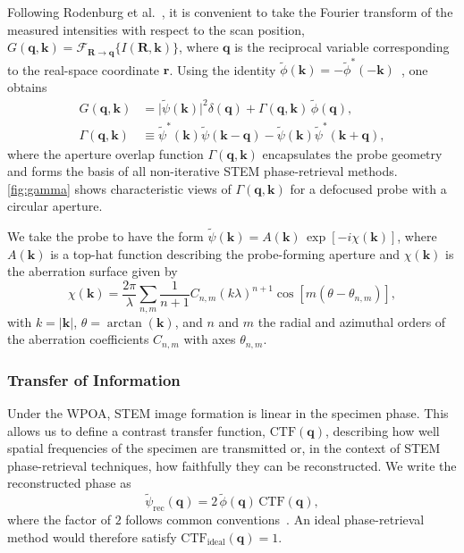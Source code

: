 \documentclass[pdflatex,sn-aps,iicol]{sn-jnl}%
\begin{document}
Following Rodenburg et al.~\cite{Rodenburg_1993}, it is convenient to take the Fourier transform of the measured intensities with respect to the scan position, $G(\boldsymbol{q},\boldsymbol{k}) = \mathcal{F}_{\boldsymbol{R}\rightarrow\boldsymbol{q}}\{I(\boldsymbol{R},\boldsymbol{k})\}$, where $\boldsymbol{q}$ is the reciprocal variable corresponding to the real-space coordinate $\boldsymbol{r}$.
Using the identity $\tilde{\phi}(\boldsymbol{k}) = -\tilde{\phi}^{*}(-\boldsymbol{k})$~\cite{Rodenburg_1993}, one obtains~\cite{Yang_2016}
\begin{align}
  G(\boldsymbol{q},\boldsymbol{k}) &= \lvert \tilde{\psi}(\boldsymbol{k}) \rvert^2 \delta(\boldsymbol{q}) + \Gamma(\boldsymbol{q},\boldsymbol{k})\,\tilde{\phi}(\boldsymbol{q}), \\
  \Gamma(\boldsymbol{q},\boldsymbol{k}) &\equiv \tilde{\psi}^{*}(\boldsymbol{k})\tilde{\psi}(\boldsymbol{k}-\boldsymbol{q}) - \tilde{\psi}(\boldsymbol{k})\tilde{\psi}^{*}(\boldsymbol{k}+\boldsymbol{q}),
  \label{eq:wpoa-forward}
\end{align}
where the aperture overlap function $\Gamma(\boldsymbol{q},\boldsymbol{k})$ encapsulates the probe geometry and forms the basis of all non-iterative STEM phase-retrieval methods.
\cref{fig:gamma} shows characteristic views of $\Gamma(\boldsymbol{q},\boldsymbol{k})$ for a defocused probe with a circular aperture.

We take the probe to have the form $\tilde{\psi}(\boldsymbol{k}) = A(\boldsymbol{k})\,\exp[-i\chi(\boldsymbol{k})]$, where $A(\boldsymbol{k})$ is a top-hat function describing the probe-forming aperture and $\chi(\boldsymbol{k})$ is the aberration surface given by
\begin{equation}
  \chi(\boldsymbol{k}) = \frac{2\pi}{\lambda} \sum_{n,m} \frac{1}{n+1} C_{n,m} (k\lambda)^{n+1} \cos\!\left[m(\theta-\theta_{n,m})\right],
  \label{eq:chi}
\end{equation}
with $k=\lvert\boldsymbol{k}\rvert$, $\theta=\arctan(\boldsymbol{k})$, and $n$ and $m$ the radial and azimuthal orders of the aberration coefficients $C_{n,m}$ with axes $\theta_{n,m}$.

\subsubsection{Transfer of Information}

Under the WPOA, STEM image formation is linear in the specimen phase.
This allows us to define a contrast transfer function, $\mathrm{CTF}(\boldsymbol{q})$, describing how well spatial frequencies of the specimen are transmitted or, in the context of STEM phase-retrieval techniques, how faithfully they can be reconstructed.
We write the reconstructed phase as
\begin{equation}
  \tilde{\psi}_{\text{rec}}(\boldsymbol{q}) = 2\,\tilde{\phi}(\boldsymbol{q})\,\mathrm{CTF}(\boldsymbol{q}),
  \label{eq:recon-ctf}
\end{equation}
where the factor of $2$ follows common conventions~\cite{Dwyer_2024,Vega_2025}.
An ideal phase-retrieval method would therefore satisfy $\mathrm{CTF}_{\text{ideal}}(\boldsymbol{q})=1$.
\end{document}
